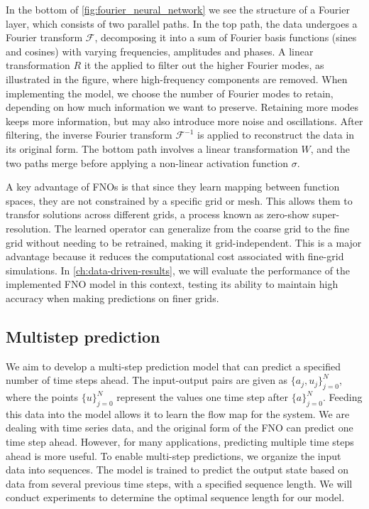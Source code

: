 In the bottom of \autoref{fig:fourier_neural_network} we see the structure of a Fourier layer, which consists of two parallel paths.
In the top path, the data undergoes a Fourier transform $\mathcal{F}$, decomposing it into a sum of Fourier basis functions (sines and cosines) with varying frequencies, amplitudes and phases.
A linear transformation $R$ it the applied to filter out the higher Fourier modes, as illustrated in the figure, where high-frequency components are removed.
When implementing the model, we choose the number of Fourier modes to retain, depending on how much information we want to preserve.
Retaining more modes keeps more information, but may also introduce more noise and oscillations.
After filtering, the inverse Fourier transform $\mathcal{F}^{-1}$ is applied to reconstruct the data in its original form.
The bottom path involves a linear transformation $W$, and the two paths merge before applying a non-linear activation function $\sigma$.

A key advantage of FNOs is that since they learn mapping between function spaces, they are not constrained by a specific grid or mesh.
This allows them to transfor solutions across different grids, a process known as zero-show super-resolution.
The learned operator can generalize from the coarse grid to the fine grid without needing to be retrained, making it grid-independent.
This is a major advantage because it reduces the computational cost associated with fine-grid simulations.
In \autoref{ch:data-driven-results}, we will evaluate the performance of the implemented FNO model in this context, testing its ability to maintain high accuracy when making predictions on finer grids.

\subsection*{Multistep prediction}
We aim to develop a multi-step prediction model that can predict a specified number of time steps ahead.
The input-output pairs are given as $\{a_j, u_j\}_{j=0}^N$, where the points $\{u\}_{j=0}^N$ represent the values one time step after $\{a\}_{j=0}^N$.
Feeding this data into the model allows it to learn the flow map for the system.
We are dealing with time series data, and the original form of the FNO can predict one time step ahead.
However, for many applications, predicting multiple time steps ahead is more useful.
To enable multi-step predictions, we organize the input data into sequences.
The model is trained to predict the output state based on data from several previous time steps, with a specified sequence length.
We will conduct experiments to determine the optimal sequence length for our model.

